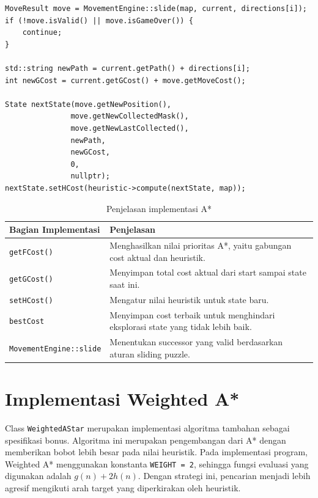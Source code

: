 \begin{tcolorbox}[
	colback=red!5,
	colframe=red!60!black,
	title=\textbf{Potongan Source Code Asli: Ekspansi State pada A*},
	arc=2mm,
	boxrule=0.8pt
]
\small
\begin{verbatim}
MoveResult move = MovementEngine::slide(map, current, directions[i]);
if (!move.isValid() || move.isGameOver()) {
    continue;
}

std::string newPath = current.getPath() + directions[i];
int newGCost = current.getGCost() + move.getMoveCost();

State nextState(move.getNewPosition(),
               move.getNewCollectedMask(),
               move.getNewLastCollected(),
               newPath,
               newGCost,
               0,
               nullptr);
nextState.setHCost(heuristic->compute(nextState, map));
\end{verbatim}
\end{tcolorbox}

\begin{table}[H]
	\centering
	\caption{Penjelasan implementasi A*}
	\begin{tabular}{|p{4cm}|p{10cm}|}
		\hline
		\rowcolor{red!15}
		\textbf{Bagian Implementasi} & \textbf{Penjelasan} \\
		\hline
		\texttt{getFCost()} & Menghasilkan nilai prioritas A*, yaitu gabungan cost aktual dan heuristik. \\
		\hline
		\texttt{getGCost()} & Menyimpan total cost aktual dari start sampai state saat ini. \\
		\hline
		\texttt{setHCost()} & Mengatur nilai heuristik untuk state baru. \\
		\hline
		\texttt{bestCost} & Menyimpan cost terbaik untuk menghindari eksplorasi state yang tidak lebih baik. \\
		\hline
		\texttt{MovementEngine::slide} & Menentukan successor yang valid berdasarkan aturan sliding puzzle. \\
		\hline
	\end{tabular}
\end{table}

\section{Implementasi Weighted A*}

Class \texttt{WeightedAStar} merupakan implementasi algoritma tambahan sebagai spesifikasi bonus. 
Algoritma ini merupakan pengembangan dari A* dengan memberikan bobot lebih besar pada nilai heuristik. 
Pada implementasi program, Weighted A* menggunakan konstanta \texttt{WEIGHT = 2}, sehingga fungsi evaluasi yang digunakan adalah $g(n) + 2h(n)$. 
Dengan strategi ini, pencarian menjadi lebih agresif mengikuti arah target yang diperkirakan oleh heuristik.

